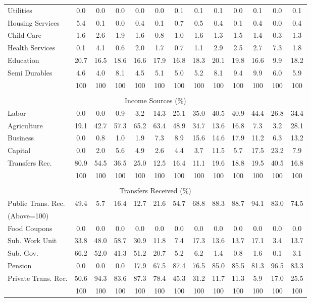 \begin{tabular}{l c c c| c c c c c| c c c| c}
Utilities    & 0.0 & 0.0 & 0.0 & 0.0 & 0.0 & 0.1 & 0.1 & 0.1 & 0.0 & 0.1 & 0.0 & 0.1 \\
Housing Services  & 5.4 & 0.1 & 0.0 & 0.4 & 0.1 & 0.7 & 0.5 & 0.4 & 0.1 & 0.4 & 0.0 & 0.4 \\
Child Care  & 1.6 & 2.6 & 1.9 & 1.6 & 0.8 & 1.0 & 1.6 & 1.3 & 1.5 & 1.4 & 0.3 & 1.3 \\
Health Services   & 0.1 & 4.1 & 0.6 & 2.0 & 1.7 & 0.7 & 1.1 & 2.9 & 2.5 & 2.7 & 7.3 & 1.8 \\
Education   & 20.7 & 16.5 & 18.6 & 16.6 & 17.9 & 16.8 & 18.3 & 20.1 & 19.8 & 16.6 & 9.9 & 18.2 \\
Semi Durables     & 4.6 & 4.0 & 8.1 & 4.5 & 5.1 & 5.0 & 5.2 & 8.1 & 9.4 & 9.9 & 6.0 & 5.9 \\
\midrule
 & 100 & 100 & 100 & 100 & 100 & 100 & 100 & 100 & 100 & 100 & 100 & 100 \\
\midrule \\
\multicolumn{13}{c}{Income Sources (\%)}  \\
\midrule
Labor        & 0.0 & 0.0 & 0.9 & 3.2 & 14.3 & 25.1 & 35.0 & 40.5 & 40.9 & 44.4 & 26.8 & 34.4 \\
Agriculture  & 19.1 & 42.7 & 57.3 & 65.2 & 63.4 & 48.9 & 34.7 & 13.6 & 16.8 & 7.3 & 3.2 & 28.1 \\
Business     & 0.0 & 0.8 & 1.0 & 1.9 & 7.3 & 8.9 & 15.6 & 14.6 & 17.9 & 11.2 & 6.3 & 13.2 \\
Capital      & 0.0 & 2.0 & 5.6 & 4.9 & 2.6 & 4.4 & 3.7 & 11.5 & 5.7 & 17.5 & 23.2 & 7.9 \\
Transfers Rec.  & 80.9 & 54.5 & 36.5 & 25.0 & 12.5 & 16.4 & 11.1 & 19.6 & 18.8 & 19.5 & 40.5 & 16.8 \\
\midrule
 & 100 & 100 & 100 & 100 & 100 & 100 & 100 & 100 & 100 & 100 & 100 & 100 \\
\midrule \\
\multicolumn{13}{c}{Transfers Received (\%)}  \\
\midrule
Public Trans. Rec.  & 49.4 & 5.7 & 16.4 & 12.7 & 21.6 & 54.7 & 68.8 & 88.3 & 88.7 & 94.1 & 83.0 & 74.5 \\
(Above=100) & & & & & & & & & & & &  \\
\hspace{.3cm} Food Coupons    & 0.0 & 0.0 & 0.0 & 0.0 & 0.0 & 0.0 & 0.0 & 0.0 & 0.0 & 0.0 & 0.0 & 0.0 \\
\hspace{.3cm} Sub. Work Unit  & 33.8 & 48.0 & 58.7 & 30.9 & 11.8 & 7.4 & 17.3 & 13.6 & 13.7 & 17.1 & 3.4 & 13.7 \\
\hspace{.3cm} Sub. Gov.       & 66.2 & 52.0 & 41.3 & 51.2 & 20.7 & 5.2 & 6.2 & 1.4 & 0.8 & 1.6 & 0.1 & 3.1 \\
\hspace{.3cm} Pension         & 0.0 & 0.0 & 0.0 & 17.9 & 67.5 & 87.4 & 76.5 & 85.0 & 85.5 & 81.3 & 96.5 & 83.3 \\
Private Trans. Rec. & 50.6 & 94.3 & 83.6 & 87.3 & 78.4 & 45.3 & 31.2 & 11.7 & 11.3 & 5.9 & 17.0 & 25.5 \\
\midrule
 & 100 & 100 & 100 & 100 & 100 & 100 & 100 & 100 & 100 & 100 & 100 & 100 \\
\bottomrule
\end{tabular}